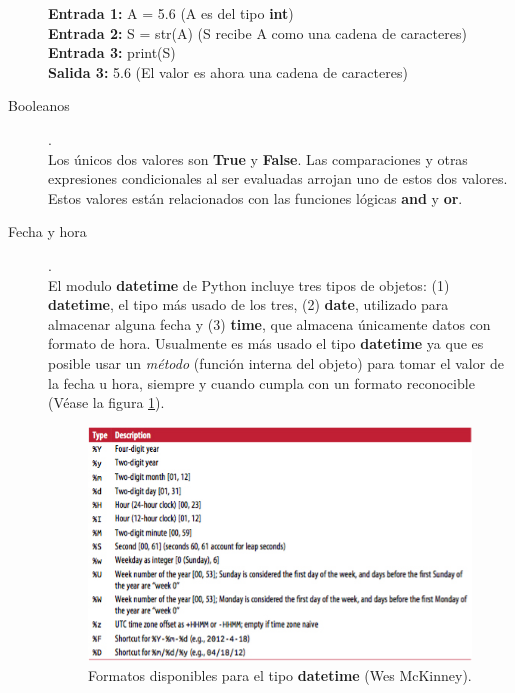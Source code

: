 \documentclass[a4paper]{article}
\begin{document}
\begin{description}
{\raggedright 
\textbf{Entrada 1:} A = 5.6 (A es del tipo \textbf{int}) \\
\textbf{Entrada 2:} S = str(A) (S recibe A como una cadena de caracteres) \\
\textbf{Entrada 3:} print(S) \\
\textbf{Salida 3:} 5.6 (El valor es ahora una cadena de caracteres)}

\item[Booleanos]. \\
Los únicos dos valores son \textbf{True} y \textbf{False}. Las comparaciones y otras expresiones condicionales al ser evaluadas arrojan uno de estos dos valores. Estos valores están relacionados con las funciones lógicas \textbf{and} y \textbf{or}.

\item[Fecha y hora]. \\
El modulo \textbf{datetime} de Python incluye tres tipos de objetos: (1) \textbf{datetime}, el tipo más usado de los tres, (2) \textbf{date}, utilizado para almacenar alguna fecha y (3) \textbf{time}, que almacena únicamente datos con formato de hora. Usualmente es más usado el tipo \textbf{datetime} ya que es posible usar un \textit{método} (función interna del objeto) para tomar el valor de la fecha u hora, siempre y cuando cumpla con un formato reconocible (Véase la figura \ref{fig:formatos}).

\begin{figure}[h!]
	\center
	\includegraphics[scale=.65]{./Images/formatos}
	\caption{\label{fig:formatos} Formatos disponibles para el tipo \textbf{datetime} (Wes McKinney).}
\end{figure}

\end{description}
\end{document}
